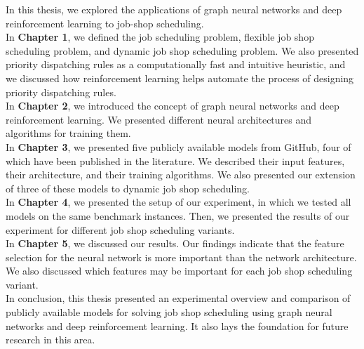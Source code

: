

In this thesis, we explored the applications of graph neural networks and deep reinforcement learning to job-shop scheduling.\\
In \textbf{Chapter 1}, we defined the job scheduling problem, flexible job shop scheduling problem, and dynamic job shop scheduling problem. We also presented priority dispatching rules as a computationally fast and intuitive heuristic, and we discussed how reinforcement learning helps automate the process of designing priority dispatching rules.\\
In \textbf{Chapter 2}, we introduced the concept of graph neural networks and deep reinforcement learning. We presented different neural architectures and algorithms for training them.\\
In \textbf{Chapter 3}, we presented five publicly available models from GitHub, four of which have been published in the literature. We described their input features, their architecture, and their training algorithms. We also presented our extension of three of these models to dynamic job shop scheduling.\\
In \textbf{Chapter 4}, we presented the setup of our experiment, in which we tested all models on the same benchmark instances. Then, we presented the results of our experiment for different job shop scheduling variants.\\
In \textbf{Chapter 5}, we discussed our results. Our findings indicate that the feature selection for the neural network is more important than the network architecture. We also discussed which features may be important for each job shop scheduling variant.\\
In conclusion, this thesis presented an experimental overview and comparison of publicly available models for solving job shop scheduling using graph neural networks and deep reinforcement learning. It also lays the foundation for future research in this area.